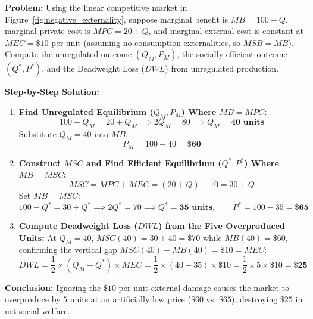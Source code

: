 \documentclass[11pt,letterpaper]{article}
\begin{document}
\begin{tcolorbox}[colback=CourseBlue!5!white,colframe=CourseBlue!80!black,title=\textbf{Work It Out: Quantifying Overproduction and Deadweight Loss}]
\textbf{Problem:} Using the linear competitive market in Figure~\ref{fig:negative_externality}, suppose marginal benefit is $MB = 100 - Q$, marginal private cost is $MPC = 20 + Q$, and marginal external cost is constant at $MEC = \$10$ per unit (assuming no consumption externalities, so $MSB = MB$). Compute the unregulated outcome $(Q_M, P_M)$, the socially efficient outcome $(Q^*, P^*)$, and the Deadweight Loss ($DWL$) from unregulated production.

\medskip
\noindent\textbf{Step-by-Step Solution:}
\begin{enumerate}
    \item \textbf{Find Unregulated Equilibrium ($Q_M, P_M$) Where $MB = MPC$:}
    \[
    100 - Q_M = 20 + Q_M \implies 2Q_M = 80 \implies Q_M = \mathbf{40\text{ units}}
    \]
    Substitute $Q_M = 40$ into $MB$:
    \[
    P_M = 100 - 40 = \mathbf{\$60}
    \]

    \item \textbf{Construct $MSC$ and Find Efficient Equilibrium ($Q^*, P^*$) Where $MB = MSC$:}
    \[
    MSC = MPC + MEC = (20 + Q) + 10 = 30 + Q
    \]
    Set $MB = MSC$:
    \[
    100 - Q^* = 30 + Q^* \implies 2Q^* = 70 \implies Q^* = \mathbf{35\text{ units}}, \qquad P^* = 100 - 35 = \mathbf{\$65}
    \]

    \item \textbf{Compute Deadweight Loss ($DWL$) from the Five Overproduced Units:}
    At $Q_M = 40$, $MSC(40) = 30 + 40 = \$70$ while $MB(40) = \$60$, confirming the vertical gap $MSC(40) - MB(40) = \$10 = MEC$:
    \[
    DWL = \frac{1}{2} \times (Q_M - Q^*) \times MEC = \frac{1}{2} \times (40 - 35) \times \$10 = \frac{1}{2} \times 5 \times \$10 = \mathbf{\$25}
    \]
\end{enumerate}
\textbf{Conclusion:} Ignoring the $\$10$ per-unit external damage causes the market to overproduce by $5$ units at an artificially low price ($\$60$ vs. $\$65$), destroying $\$25$ in net social welfare.
\end{tcolorbox}
\end{document}
